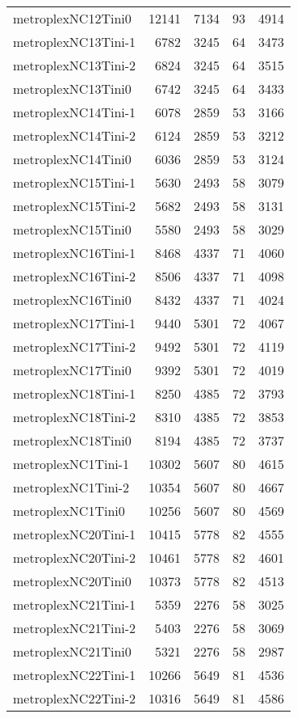 \documentclass[../../../thesis.tex]{subfiles}
\begin{document}
\begin{longtable}{lrrrr}
metroplexNC12Tini0 & 12141 & 7134 & 93 & 4914 \\
metroplexNC13Tini-1 & 6782 & 3245 & 64 & 3473 \\
metroplexNC13Tini-2 & 6824 & 3245 & 64 & 3515 \\
metroplexNC13Tini0 & 6742 & 3245 & 64 & 3433 \\
metroplexNC14Tini-1 & 6078 & 2859 & 53 & 3166 \\
metroplexNC14Tini-2 & 6124 & 2859 & 53 & 3212 \\
metroplexNC14Tini0 & 6036 & 2859 & 53 & 3124 \\
metroplexNC15Tini-1 & 5630 & 2493 & 58 & 3079 \\
metroplexNC15Tini-2 & 5682 & 2493 & 58 & 3131 \\
metroplexNC15Tini0 & 5580 & 2493 & 58 & 3029 \\
metroplexNC16Tini-1 & 8468 & 4337 & 71 & 4060 \\
metroplexNC16Tini-2 & 8506 & 4337 & 71 & 4098 \\
metroplexNC16Tini0 & 8432 & 4337 & 71 & 4024 \\
metroplexNC17Tini-1 & 9440 & 5301 & 72 & 4067 \\
metroplexNC17Tini-2 & 9492 & 5301 & 72 & 4119 \\
metroplexNC17Tini0 & 9392 & 5301 & 72 & 4019 \\
metroplexNC18Tini-1 & 8250 & 4385 & 72 & 3793 \\
metroplexNC18Tini-2 & 8310 & 4385 & 72 & 3853 \\
metroplexNC18Tini0 & 8194 & 4385 & 72 & 3737 \\
metroplexNC1Tini-1 & 10302 & 5607 & 80 & 4615 \\
metroplexNC1Tini-2 & 10354 & 5607 & 80 & 4667 \\
metroplexNC1Tini0 & 10256 & 5607 & 80 & 4569 \\
metroplexNC20Tini-1 & 10415 & 5778 & 82 & 4555 \\
metroplexNC20Tini-2 & 10461 & 5778 & 82 & 4601 \\
metroplexNC20Tini0 & 10373 & 5778 & 82 & 4513 \\
metroplexNC21Tini-1 & 5359 & 2276 & 58 & 3025 \\
metroplexNC21Tini-2 & 5403 & 2276 & 58 & 3069 \\
metroplexNC21Tini0 & 5321 & 2276 & 58 & 2987 \\
metroplexNC22Tini-1 & 10266 & 5649 & 81 & 4536 \\
metroplexNC22Tini-2 & 10316 & 5649 & 81 & 4586 \\

\end{longtable}
\end{document}
